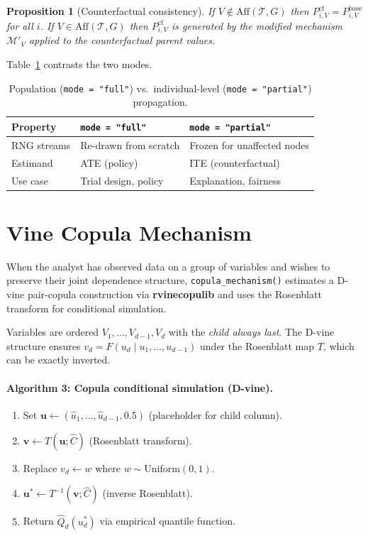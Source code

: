 \documentclass[12pt,a4paper]{article}
\newcommand{\pkg}[1]{\textbf{#1}}
\newcommand{\code}[1]{\texttt{#1}}
\newtheorem{proposition}{Proposition}
\begin{document}
\begin{proposition}[Counterfactual consistency]
If $V\notin\mathrm{Aff}(\mathcal{T},G)$ then $P^{\mathrm{cf}}_{i,V} = P^{\mathrm{base}}_{i,V}$ for all $i$. If $V\in\mathrm{Aff}(\mathcal{T},G)$ then $P^{\mathrm{cf}}_{i,V}$ is generated by the modified mechanism $\mathcal{M}'_V$ applied to the counterfactual parent values.
\end{proposition}

Table~\ref{tab:modes} contrasts the two modes.

\begin{table}[ht]
\centering
\caption{Population (\code{mode = "full"}) vs.\ individual-level (\code{mode = "partial"}) propagation.}
\label{tab:modes}
\small
\begin{tabular}{lll}
\toprule
Property & \code{mode = "full"} & \code{mode = "partial"} \\
\midrule
RNG streams & Re-drawn from scratch & Frozen for unaffected nodes \\
Estimand & ATE (policy) & ITE (counterfactual) \\
Use case & Trial design, policy & Explanation, fairness \\
\bottomrule
\end{tabular}
\end{table}

\section{Vine Copula Mechanism}
\label{sec:copula}

When the analyst has observed data on a group of variables and wishes to preserve their joint dependence structure, \code{copula\_mechanism()} estimates a D-vine pair-copula construction \citep{aas2009pair, dissmann2013selecting} via \pkg{rvinecopulib} \citep{nagler2021rvinecopulib} and uses the Rosenblatt transform \citep{rosenblatt1952remarks} for conditional simulation.

Variables are ordered $V_1,\ldots,V_{d-1}, V_d$ with the \emph{child always last}. The D-vine structure ensures $v_d = F(u_d \mid u_1,\ldots,u_{d-1})$ under the Rosenblatt map $T$, which can be exactly inverted.

\paragraph{Algorithm 3: Copula conditional simulation (D-vine).}
\begin{enumerate}
  \item Set $\mathbf{u} \leftarrow (\hat{u}_1,\ldots,\hat{u}_{d-1}, 0.5)$ (placeholder for child column).
  \item $\mathbf{v} \leftarrow T(\mathbf{u};\hat{C})$ \quad (Rosenblatt transform).
  \item Replace $v_d \leftarrow w$ where $w\sim\mathrm{Uniform}(0,1)$.
  \item $\mathbf{u}^* \leftarrow T^{-1}(\mathbf{v};\hat{C})$ \quad (inverse Rosenblatt).
  \item Return $\hat{Q}_d(u_d^*)$ via empirical quantile function.
\end{enumerate}
\end{document}
